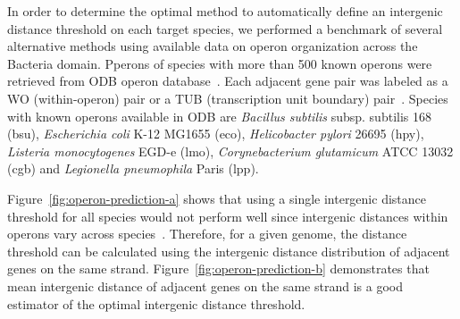 In order to determine the optimal method to automatically define an intergenic
distance threshold on each target species, we performed a benchmark of several
alternative methods using available data on operon organization across the
Bacteria domain. Pperons of species with more than 500 known operons were
retrieved from ODB operon database~\citep{okuda2006odb}. Each adjacent gene pair
was labeled as a WO (within-operon) pair or a TUB (transcription unit boundary)
pair~\citep{chen2004computational}. Species with known operons available in ODB
are \textit{Bacillus subtilis} subsp. subtilis 168 (bsu), \textit{Escherichia
  coli} K-12 MG1655 (eco), \textit{Helicobacter pylori} 26695 (hpy),
\textit{Listeria monocytogenes} EGD-e (lmo), \textit{Corynebacterium
  glutamicum} ATCC 13032 (cgb) and \textit{Legionella pneumophila} Paris (lpp).

Figure~\ref{fig:operon-prediction-a} shows that using a single intergenic
distance threshold for all species would not perform well since intergenic
distances within operons vary across
species~\citep{rogozin2002congruent}. Therefore, for a given genome, the
distance threshold can be calculated using the intergenic distance distribution
of adjacent genes on the same strand. Figure~\ref{fig:operon-prediction-b}
demonstrates that mean intergenic distance of adjacent genes on the same strand
is a good estimator of the optimal intergenic distance threshold.

